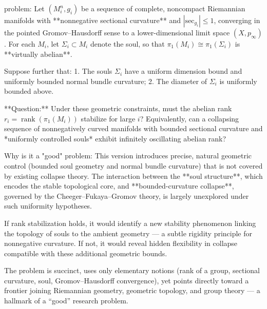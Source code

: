 problem:  
Let \((M_i^n, g_i)\) be a sequence of complete, noncompact Riemannian manifolds with **nonnegative sectional curvature** and \(|\mathrm{sec}_{g_i}|\le1\), converging in the pointed Gromov–Hausdorff sense to a lower-dimensional limit space \((X,p_\infty)\).  
For each \(M_i\), let \(\Sigma_i\subset M_i\) denote the soul, so that \(\pi_1(M_i)\cong\pi_1(\Sigma_i)\) is **virtually abelian**.  

Suppose further that:  
1. The souls \(\Sigma_i\) have a uniform dimension bound and uniformly bounded normal bundle curvature;  
2. The diameter of \(\Sigma_i\) is uniformly bounded above.  

**Question:**  
Under these geometric constraints, must the abelian rank \(r_i = \operatorname{rank}(\pi_1(M_i))\) stabilize for large \(i\)?  
Equivalently, can a collapsing sequence of nonnegatively curved manifolds with bounded sectional curvature and *uniformly controlled souls* exhibit infinitely oscillating abelian rank?  

Why is it a "good" problem:  
This version introduces precise, natural geometric control (bounded soul geometry and normal bundle curvature) that is not covered by existing collapse theory. The interaction between the **soul structure**, which encodes the stable topological core, and **bounded-curvature collapse**, governed by the Cheeger–Fukaya–Gromov theory, is largely unexplored under such uniformity hypotheses.  

If rank stabilization holds, it would identify a new stability phenomenon linking the topology of souls to the ambient geometry — a subtle rigidity principle for nonnegative curvature. If not, it would reveal hidden flexibility in collapse compatible with these additional geometric bounds.  

The problem is succinct, uses only elementary notions (rank of a group, sectional curvature, soul, Gromov–Hausdorff convergence), yet points directly toward a frontier joining Riemannian geometry, geometric topology, and group theory — a hallmark of a “good” research problem.